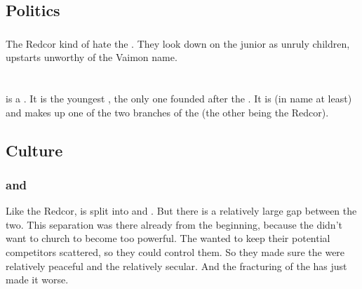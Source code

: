 \subsection{Politics}





\subsubsection{\ClanTelcra}
The Redcor kind of hate the \Telcras. 
They look down on the junior \vclan as unruly children, upstarts unworthy of the Vaimon name. 















\section{\Telcra}
\index{\Telcra}
\Telcra{} is a \VaimonClan. 
It is the youngest \vclan, the only one founded after the \darkfall. 
It is \Iquinian{} (in name at least) and makes up one of the two branches of the  (the other being the Redcor). 









\subsection{Culture}






\subsubsection{\Clerics{} and \templars}
\index{\cleric!\Telcra}
\index{\templar!\Telcra}
\index{\Telcra!\cleric}
\index{\Telcra!\templar}
Like the Redcor, \ClanTelcra{} is split into \clerics{} and \templars. 
But there is a relatively large gap between the two. 
This separation was there already from the beginning, because the \baccons{} didn't want to church to become too powerful. 
The \baccons{} wanted to keep their potential competitors scattered, so they could control them. 
So they made sure the \Telcra{} \clerics{} were relatively peaceful and the \templars{} relatively secular. 
And the fracturing of the \vclan has just made it worse. 

